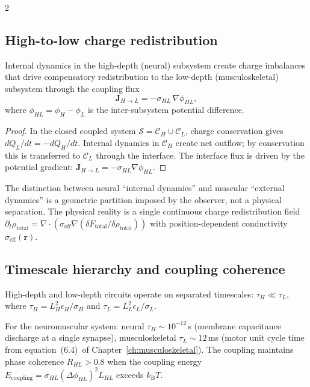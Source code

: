 \begin{multicols}{2}
\subsection{High-to-low charge redistribution}

\begin{theorem}
\label{thm:ch07-hilo}
Internal dynamics in the high-depth (neural) subsystem create charge
imbalances that drive compensatory redistribution to the low-depth
(musculoskeletal) subsystem through the coupling flux
\begin{equation}
  \mathbf{J}_{H\to L} = -\sigma_{HL}\,\nabla\phi_{HL},
  \label{eq:ch07-flux}
\end{equation}
where $\phi_{HL} = \phi_H - \phi_L$ is the inter-subsystem potential
difference.
\end{theorem}

\begin{proof}
In the closed coupled system $\mathcal{S} = \mathcal{C}_H \cup \mathcal{C}_L$,
charge conservation gives $dQ_L/dt = -dQ_H/dt$.  Internal dynamics in
$\mathcal{C}_H$ create net outflow; by conservation this is transferred to
$\mathcal{C}_L$ through the interface.  The interface flux is driven by the
potential gradient: $\mathbf{J}_{H\to L} = -\sigma_{HL}\nabla\phi_{HL}$.
\end{proof}

\begin{theorem}
\label{thm:ch07-unified}
The distinction between neural ``internal dynamics'' and muscular ``external
dynamics'' is a geometric partition imposed by the observer, not a physical
separation.  The physical reality is a single continuous charge redistribution
field $\partial_t\rho_{\mathrm{total}} = \nabla\cdot(\sigma_{\mathrm{eff}}
\nabla(\delta F_{\mathrm{total}}/\delta\rho_{\mathrm{total}}))$ with
position-dependent conductivity $\sigma_{\mathrm{eff}}(\mathbf{r})$.
\end{theorem}

\subsection{Timescale hierarchy and coupling coherence}

\begin{theorem}
\label{thm:ch07-timescale}
High-depth and low-depth circuits operate on separated timescales:
$\tau_H \ll \tau_L$, where $\tau_H = L_H^2\epsilon_H/\sigma_H$ and
$\tau_L = L_L^2\epsilon_L/\sigma_L$.
\end{theorem}

For the neuromuscular system: neural $\tau_H \sim 10^{-12}$\,s (membrane
capacitance discharge at a single synapse), musculoskeletal $\tau_L \sim
12$\,ms (motor unit cycle time from equation~(6.4)~of
Chapter~\ref{ch:musculoskeletal}).  The coupling maintains phase coherence
$R_{HL} > 0.8$ when the coupling energy $E_{\mathrm{coupling}} =
\sigma_{HL}(\Delta\phi_{HL})^2 L_{HL}$ exceeds $k_{\mathrm{B}}T$.

\end{multicols}

